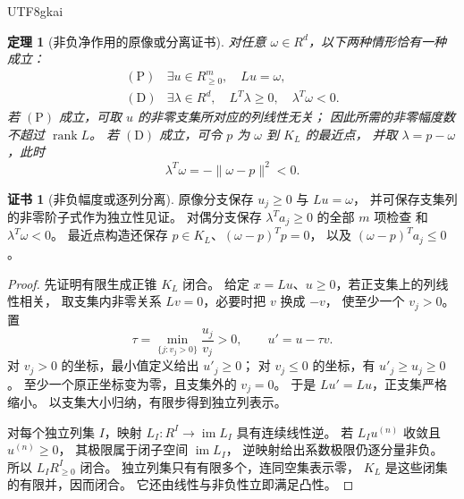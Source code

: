 \documentclass[12pt,a4paper,openany,notitlepage]{report}
\theoremstyle{plain}
\newtheorem{theorem}{定理}[chapter]
\theoremstyle{definition}
\newtheorem*{certificate}{证书}
\theoremstyle{remark}
\def\mathcal#1{#1}\def\mathsf#1{#1}\def\mathbb#1{#1}%
\begin{document}
\begin{CJK*}{UTF8}{gkai}
\begin{theorem}[非负净作用的原像或分离证书]
\label{exp:hom:finite-farkas}
对任意 $\omega\in\mathbb R^d$，以下两种情形恰有一种成立：
\[
 \begin{array}{ll}
 \mathrm{(P)}&
 \exists u\in\mathbb R_{\ge0}^m,\quad Lu=\omega,\\[2pt]
 \mathrm{(D)}&
 \exists\lambda\in\mathbb R^d,\quad
 L^{\mathsf T}\lambda\ge0,\quad
 \lambda^{\mathsf T}\omega<0.
 \end{array}
\]
若 $\mathrm{(P)}$ 成立，可取 $u$ 的非零支集所对应的列线性无关；
因此所需的非零幅度数不超过 $\operatorname{rank}L$。
若 $\mathrm{(D)}$ 成立，可令
$p$ 为 $\omega$ 到 $\mathcal K_L$ 的最近点，
并取 $\lambda=p-\omega$，此时
\[
 \lambda^{\mathsf T}\omega=-\|\omega-p\|^2<0.
\]
\end{theorem}
\begin{certificate}[非负幅度或逐列分离]
原像分支保存 $u_j\ge0$ 与 $Lu=\omega$，
并可保存支集列的非零阶子式作为独立性见证。
对偶分支保存 $\lambda^{\mathsf T}a_j\ge0$ 的全部 $m$ 项检查
和 $\lambda^{\mathsf T}\omega<0$。
最近点构造还保存
$p\in\mathcal K_L$、$(\omega-p)^{\mathsf T}p=0$，
以及 $(\omega-p)^{\mathsf T}a_j\le0$。
\end{certificate}
\begin{proof}
先证明有限生成正锥 $\mathcal K_L$ 闭合。
给定 $x=Lu$、$u\ge0$，若正支集上的列线性相关，
取支集内非零关系 $Lv=0$，必要时把 $v$ 换成 $-v$，
使至少一个 $v_j>0$。
置
\[
 \tau=\min_{\{j:v_j>0\}}\frac{u_j}{v_j}>0,
 \qquad u'=u-\tau v.
\]
对 $v_j>0$ 的坐标，最小值定义给出 $u'_j\ge0$；
对 $v_j\le0$ 的坐标，有 $u'_j\ge u_j\ge0$。
至少一个原正坐标变为零，且支集外的 $v_j=0$。
于是 $Lu'=Lu$，正支集严格缩小。
以支集大小归纳，有限步得到独立列表示。

对每个独立列集 $I$，映射
$L_I:\mathbb R^{I}\to\operatorname{im}L_I$ 具有连续线性逆。
若 $L_Iu^{(n)}$ 收敛且 $u^{(n)}\ge0$，
其极限属于闭子空间 $\operatorname{im}L_I$，
逆映射给出系数极限仍逐分量非负。
所以 $L_I\mathbb R_{\ge0}^{I}$ 闭合。
独立列集只有有限多个，连同空集表示零，
$\mathcal K_L$ 是这些闭集的有限并，因而闭合。
它还由线性与非负性立即满足凸性。


\end{proof}
\end{CJK*}
\end{document}
